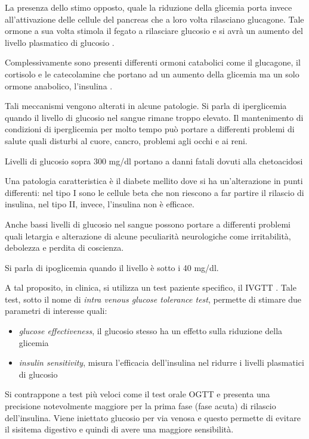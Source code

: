 La presenza dello stimo opposto, quale la riduzione della glicemia porta invece all'attivazione delle cellule del pancreas che a loro volta rilasciano glucagone. Tale ormone a sua volta stimola il fegato a rilasciare glucosio e si avrà un aumento del livello plasmatico di glucosio \cite{sherwood_fisiologia_2008}.

Complessivamente sono presenti differenti ormoni catabolici come il glucagone, il cortisolo e le catecolamine che portano ad un aumento della glicemia ma un solo ormone anabolico, l'insulina \cite{nelson_lehninger_2021}.

Tali meccanismi vengono alterati in alcune patologie. 
Si parla di iperglicemia quando il livello di glucosio nel sangue rimane troppo elevato. Il mantenimento di condizioni di iperglicemia per molto tempo può portare a differenti problemi di salute quali disturbi al cuore, cancro, problemi agli occhi e ai reni. 

Livelli di glucosio sopra 300 mg/dl portano a danni fatali dovuti alla chetoacidosi

Una patologia caratteristica è il diabete mellito dove si ha un'alterazione in punti differenti: nel tipo I sono le cellule beta che non riescono a far partire il rilascio di insulina, nel tipo II, invece, l'insulina non è efficace.

Anche bassi livelli di glucosio nel sangue possono portare a differenti problemi quali letargia e alterazione di alcune peculiarità neurologiche come irritabilità, debolezza e perdita di coscienza.

Si parla di ipoglicemia quando il livello è sotto i 40 mg/dl.

A tal proposito, in clinica, si utilizza un test paziente specifico, il IVGTT \cite{darden_predicting_2020-1}. Tale test, sotto il nome di \textit{intra venous glucose tolerance test}, permette di stimare due parametri di interesse quali:

\begin{itemize}
	\item \textit{glucose effectiveness}, il glucosio stesso ha un effetto sulla riduzione della glicemia
	\item \textit{insulin sensitivity}, misura l'efficacia dell'insulina nel ridurre i livelli plasmatici di glucosio
\end{itemize}

Si contrappone a test più veloci come il test orale OGTT e presenta una precisione notevolmente maggiore per la prima fase (fase acuta) di rilascio dell'insulina. Viene iniettato glucosio per via venosa e questo permette di evitare il sisitema digestivo e quindi di avere una maggiore sensibilità.

